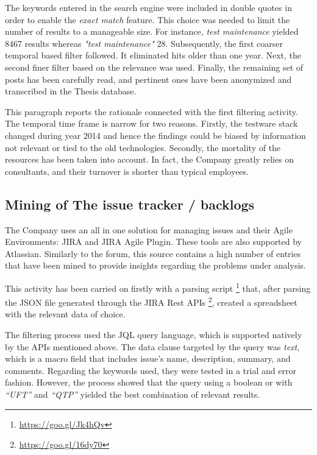 The keywords entered in the search engine were included in double quotes in order to enable the \textit{exact match} feature. This choice was needed to limit the number of results to a manageable size. For instance, \textit{test maintenance} yielded 8467 results whereas \textit{"test maintenance"} 28. Subsequently, the first coarser temporal based filter followed. It eliminated hits older than one year. Next, the second finer filter based on the relevance was used. Finally, the remaining set of posts has been carefully read, and pertinent ones have been anonymized and transcribed in the Thesis database.

This paragraph reports the rationale connected with the first filtering activity. The temporal time frame is narrow for two reasons. Firstly, the testware stack changed during year 2014 and hence the findings could be biased by information not relevant or tied to the old technologies. Secondly, the mortality of the resources has been taken into account. In fact, the Company greatly relies on consultants, and their turnover is shorter than typical employees.

\subsection{Mining of The issue tracker / backlogs} \label{mining_issue_tracker}
The Company uses an all in one solution for managing issues and their Agile Environments: JIRA and JIRA Agile Plugin. These tools are also supported by Atlassian. Similarly to the forum, this source contains a high number of entries that have been mined to provide insights regarding the problems under analysis.

This activity has been carried on firstly with a parsing script \footnote{\href{https://goo.gl/Jk4hQv}{https://goo.gl/Jk4hQv}} that, after parsing the JSON file generated through the JIRA Rest APIs \footnote{\href{https://goo.gl/16dy70}{https://goo.gl/16dy70}}, created a spreadsheet with the relevant data of choice.

The filtering process used the JQL query language, which is supported natively by the APIs mentioned above. The data clause targeted by the query was \textit{text}, which is a macro field that includes issue's name, description, summary, and comments. Regarding the keywords used, they were tested in a trial  and error fashion. However, the process showed that the query using a boolean or with \textit{``UFT''} and \textit{``QTP''} yielded the best combination of relevant results.

